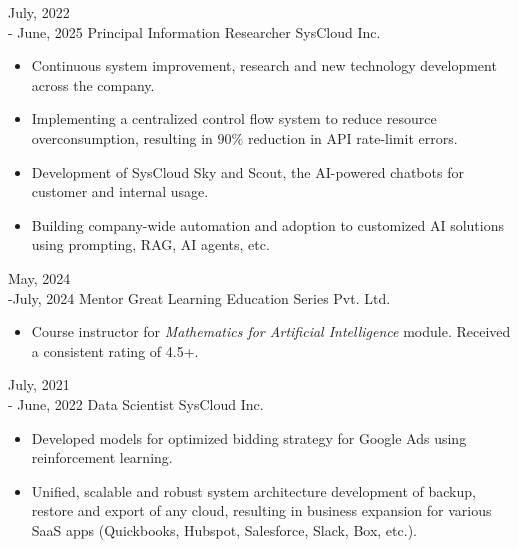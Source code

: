 \documentclass[10pt]{developercv} %
\begin{document}
\vspace{-12pt}
\begin{entrylist}
    \entry
    {July, 2022\\ - June, 2025}
    {Principal Information Researcher}
    {SysCloud Inc.}
    {\vspace{-7pt}\small
        \begin{itemize}[noitemsep,topsep=0pt,parsep=0pt,partopsep=0pt, leftmargin=10pt]
            \item Continuous system improvement, research and new technology development across the company.
            \item Implementing a centralized control flow system to reduce resource overconsumption, resulting in $90\%$ reduction in API rate-limit errors.
            \item Development of SysCloud Sky and Scout, the AI-powered chatbots for customer and internal usage.  
            \item Building company-wide automation and adoption to customized AI solutions using prompting, RAG, AI agents, etc.
        \end{itemize}
    }
    \entry
    {May, 2024\\-July, 2024}
    {Mentor}
    {Great Learning Education Series Pvt. Ltd.}
    {\vspace{-7pt}\small
        \begin{itemize}[noitemsep,topsep=0pt,parsep=0pt,partopsep=0pt,leftmargin=10pt]
            \item Course instructor for \textit{Mathematics for Artificial Intelligence} module. Received a consistent rating of 4.5+.
        \end{itemize}
    }
    \entry
    {July, 2021\\- June, 2022}
    {Data Scientist}
    {SysCloud Inc.}
    {\vspace{-7pt}\small
        \begin{itemize}[noitemsep,topsep=0pt,parsep=0pt,partopsep=0pt, leftmargin=10pt]
            \item Developed models for optimized bidding strategy for Google Ads using reinforcement learning.
            \item Unified, scalable and robust system architecture development of backup, restore and export of any cloud, resulting in business expansion for various SaaS apps (Quickbooks, Hubspot, Salesforce, Slack, Box, etc.).

\end{itemize}}
\end{entrylist}
\end{document}
